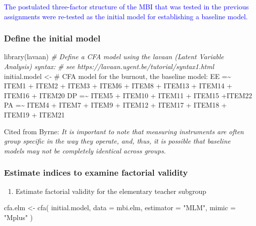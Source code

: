 \documentclass[
]{article}
\newenvironment{Shaded}{\begin{snugshade}}{\end{snugshade}}
\newcommand{\AttributeTok}[1]{\textcolor[rgb]{0.77,0.63,0.00}{#1}}
\newcommand{\CommentTok}[1]{\textcolor[rgb]{0.56,0.35,0.01}{\textit{#1}}}
\newcommand{\FunctionTok}[1]{\textcolor[rgb]{0.00,0.00,0.00}{#1}}
\newcommand{\NormalTok}[1]{#1}
\newcommand{\OtherTok}[1]{\textcolor[rgb]{0.56,0.35,0.01}{#1}}
\newcommand{\StringTok}[1]{\textcolor[rgb]{0.31,0.60,0.02}{#1}}
\providecommand{\tightlist}{%
  \setlength{\itemsep}{0pt}\setlength{\parskip}{0pt}}
\begin{document}
\textcolor{blue}{The postulated three-factor structure of the MBI that was tested in the previous assignments were re-tested as the initial model for establishing a baseline model. }

\hypertarget{define-the-initial-model}{%
\subsubsection{Define the initial model}\label{define-the-initial-model}}

\begin{Shaded}
\begin{Highlighting}[]
\FunctionTok{library}\NormalTok{(lavaan)}
\CommentTok{\# Define a CFA model using the lavaan (Latent Variable Analysis) syntax:}
\CommentTok{\# see https://lavaan.ugent.be/tutorial/syntax1.html}
\NormalTok{initial.model }\OtherTok{\textless{}{-}} \StringTok{\textquotesingle{}}
\StringTok{\# CFA model for the burnout, the baseline model:}
\StringTok{    EE =\textasciitilde{} ITEM1 + ITEM2 + ITEM3 + ITEM6 + ITEM8 + }
\StringTok{          ITEM13 + ITEM14 + ITEM16 + ITEM20}
\StringTok{    DP =\textasciitilde{} ITEM5 + ITEM10 + ITEM11 + ITEM15 +ITEM22}
\StringTok{    PA =\textasciitilde{} ITEM4 + ITEM7 + ITEM9 + ITEM12 + }
\StringTok{          ITEM17 + ITEM18 + ITEM19 + ITEM21}
\StringTok{          \textquotesingle{}}
\end{Highlighting}
\end{Shaded}

Cited from Byrne: \emph{It is important to note that measuring instruments are often group specific in the way they operate, and, thus, it is possible that baseline models may not be completely identical across groups.}

\hypertarget{estimate-indices-to-examine-factorial-validity}{%
\subsubsection{Estimate indices to examine factorial validity}\label{estimate-indices-to-examine-factorial-validity}}

\begin{enumerate}
\def\labelenumi{(\arabic{enumi})}
\tightlist
\item
  Estimate factorial validity for the elementary teacher subgroup
\end{enumerate}

\begin{Shaded}
\begin{Highlighting}[]
\NormalTok{cfa.elm }\OtherTok{\textless{}{-}} 
  \FunctionTok{cfa}\NormalTok{(}
\NormalTok{    initial.model, }
    \AttributeTok{data =}\NormalTok{ mbi.elm,  }
    \AttributeTok{estimator =} \StringTok{"MLM"}\NormalTok{,}
    \AttributeTok{mimic =} \StringTok{"Mplus"}
\NormalTok{    )}
\end{Highlighting}
\end{Shaded}
\end{document}
